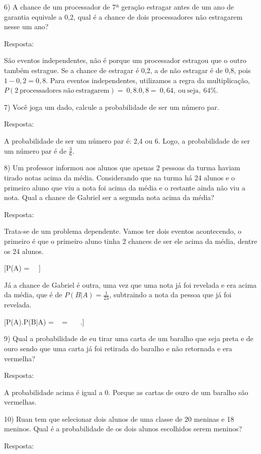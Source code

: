 6) A chance de um processador de 7ª geração estragar antes de um ano de
garantia equivale a 0,2, qual é a chance de dois processadores não
estragarem nesse um ano?

Resposta:

São eventos independentes, não é porque um processador estragou que o
outro também estrague. Se a chance de estragar é 0,2, a de não estragar
é de 0,8, pois \(1 - 0,2 = 0,8\). Para eventos independentes, utilizamos
a regra da multiplicação,
\(P(2\ \text{processad}\text{ores}\ não\ \text{estragarem}) = \ 0,8.0,8 = \ 0,64,\ \text{ou}\ \text{seja},\ 64\%.\)

7) Você joga um dado, calcule a probabilidade de ser um número par.

Resposta:

A probabilidade de ser um número par é: 2,4 ou 6. Logo, a probabilidade
de ser um número par é de \(\frac{3}{6}\).

8) Um professor informou aos alunos que apenas 2 pessoas da turma haviam
tirado notas acima da média. Considerando que na turma há 24 alunos e o
primeiro aluno que viu a nota foi acima da média e o restante ainda não
viu a nota. Qual a chance de Gabriel ser a segunda nota acima da média?

Resposta:

Trata-se de um problema dependente. Vamos ter dois eventos acontecendo,
o primeiro é que o primeiro aluno tinha 2 chances de ser ele acima da
média, dentre os 24 alunos.

[P(A) = \ \ ]

Já a chance de Gabriel é outra, uma vez que uma nota já foi revelada e
era acima da média, que é de \(P(B|A) = \frac{1}{23}\), subtraindo a
nota da pessoa que já foi revelada.

[P(A).P(B|A) = \  \times {} = \ \ \ .]

9) Qual a probabilidade de eu tirar uma carta de um baralho que seja
preta e de ouro sendo que uma carta já foi retirada do baralho e não
retornada e era vermelha?

Resposta:

A probabilidade acima é igual a 0. Porque as cartas de ouro de um
baralho são vermelhas.

10) Ruan tem que selecionar dois alunos de uma classe de 20 meninas e 18
meninos. Qual é a probabilidade de os dois alunos escolhidos serem
meninos?

Resposta:

